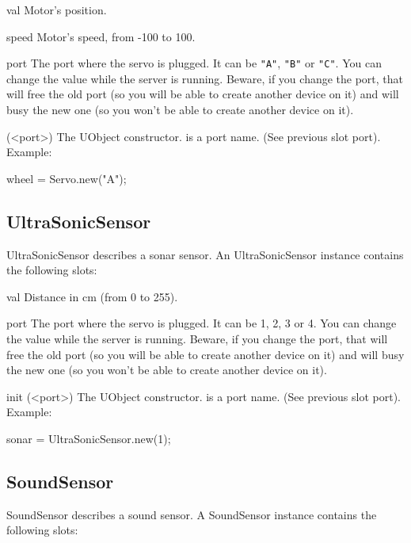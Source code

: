 \begin{urbiscriptapi}
\item[val] Motor's position.

\item[speed] Motor's speed, from -100 to 100.

\item[port] The port where the servo is plugged. It can be \lstinline{"A"},
  \lstinline{"B"} or \lstinline{"C"}. You can change the value while the
  server is running. Beware, if you change the port, that will free the old
  port (so you will be able to create another device on it) and will busy
  the new one (so you won't be able to create another device on it).

\item[init](<port>) The UObject constructor.  is a port name. (See
  previous slot port). Example:
\begin{urbiunchecked}
wheel = Servo.new("A");
\end{urbiunchecked}
\end{urbiscriptapi}


\subsection{UltraSonicSensor}
UltraSonicSensor describes a sonar sensor. An UltraSonicSensor instance
contains the following slots:

\begin{urbiscriptapi}
\item[val] Distance in cm (from 0 to 255).

\item[port] The port where the servo is plugged. It can be 1, 2, 3 or 4. You
  can change the value while the server is running. Beware, if you change
  the port, that will free the old port (so you will be able to create
  another device on it) and will busy the new one (so you won't be able to
  create another device on it).

\item[init](<port>) The UObject constructor.  is a port name. (See
  previous slot port). Example:
\begin{urbiunchecked}
sonar = UltraSonicSensor.new(1);
\end{urbiunchecked}

\end{urbiscriptapi}

\subsection{SoundSensor}
SoundSensor describes a sound sensor. A SoundSensor instance contains the
following slots:

